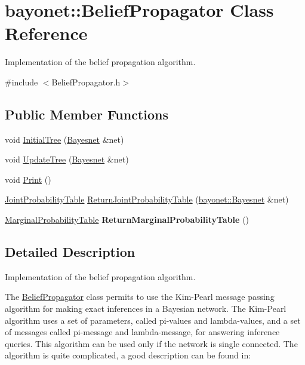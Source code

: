 \hypertarget{classbayonet_1_1_belief_propagator}{\section{bayonet\-:\-:Belief\-Propagator Class Reference}
\label{classbayonet_1_1_belief_propagator}
}


Implementation of the belief propagation algorithm.  




{\ttfamily \#include $<$Belief\-Propagator.\-h$>$}

\subsection*{Public Member Functions}
\begin{DoxyCompactItemize}
\item 
void \hyperlink{classbayonet_1_1_belief_propagator_ac9be764473228531c25af33db046d663}{Initial\-Tree} (\hyperlink{classbayonet_1_1_bayesnet}{Bayesnet} \&net)
\item 
void \hyperlink{classbayonet_1_1_belief_propagator_a8d66b5e99de3775df9beb17a084b9638}{Update\-Tree} (\hyperlink{classbayonet_1_1_bayesnet}{Bayesnet} \&net)
\item 
void \hyperlink{classbayonet_1_1_belief_propagator_ae593892ddb8eb9eb9787d487cbbce06c}{Print} ()
\item 
\hyperlink{classbayonet_1_1_joint_probability_table}{Joint\-Probability\-Table} \hyperlink{classbayonet_1_1_belief_propagator_af758ccf83bf74fd701168ba0a6196671}{Return\-Joint\-Probability\-Table} (\hyperlink{classbayonet_1_1_bayesnet}{bayonet\-::\-Bayesnet} \&net)
\item 
\hypertarget{classbayonet_1_1_belief_propagator_a69b9392c66a93f611f37f40b6aa46fbc}{\hyperlink{classbayonet_1_1_marginal_probability_table}{Marginal\-Probability\-Table} {\bfseries Return\-Marginal\-Probability\-Table} ()}\label{classbayonet_1_1_belief_propagator_a69b9392c66a93f611f37f40b6aa46fbc}

\end{DoxyCompactItemize}


\subsection{Detailed Description}
Implementation of the belief propagation algorithm. 

The \hyperlink{classbayonet_1_1_belief_propagator}{Belief\-Propagator} class permits to use the Kim-\/\-Pearl message passing algorithm for making exact inferences in a Bayesian network. The Kim-\/\-Pearl algorithm uses a set of parameters, called pi-\/values and lambda-\/values, and a set of messages called pi-\/message and lambda-\/message, for answering inference queries. This algorithm can be used only if the network is single connected. The algorithm is quite complicated, a good description can be found in\-:

